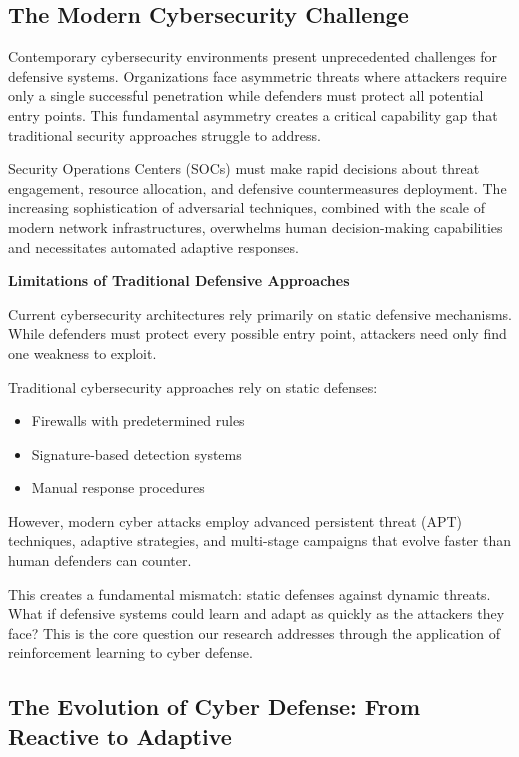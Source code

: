 \documentclass[12pt,twoside]{article}
\theoremstyle{definition}
\theoremstyle{plain}
\begin{document}
\subsection{The Modern Cybersecurity Challenge}

Contemporary cybersecurity environments present unprecedented challenges for defensive systems. Organizations face asymmetric threats where attackers require only a single successful penetration while defenders must protect all potential entry points. This fundamental asymmetry creates a critical capability gap that traditional security approaches struggle to address.

Security Operations Centers (SOCs) must make rapid decisions about threat engagement, resource allocation, and defensive countermeasures deployment. The increasing sophistication of adversarial techniques, combined with the scale of modern network infrastructures, overwhelms human decision-making capabilities and necessitates automated adaptive responses.

\textbf{Limitations of Traditional Defensive Approaches}

Current cybersecurity architectures rely primarily on static defensive mechanisms. While defenders must protect every possible entry point, attackers need only find one weakness to exploit. 

Traditional cybersecurity approaches rely on static defenses:
\begin{itemize}
    \item Firewalls with predetermined rules
    \item Signature-based detection systems  
    \item Manual response procedures
\end{itemize}

However, modern cyber attacks employ advanced persistent threat (APT) techniques, adaptive strategies, and multi-stage campaigns that evolve faster than human defenders can counter.

This creates a fundamental mismatch: static defenses against dynamic threats. What if defensive systems could learn and adapt as quickly as the attackers they face? This is the core question our research addresses through the application of reinforcement learning to cyber defense.

\subsection{The Evolution of Cyber Defense: From Reactive to Adaptive}
\end{document}
